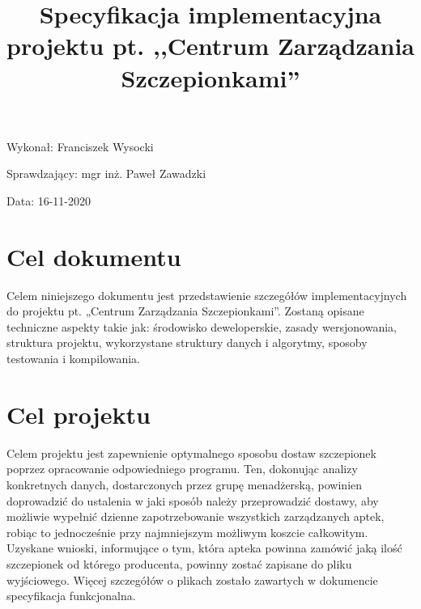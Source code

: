 \documentclass{article}
\title{Specyfikacja implementacyjna projektu pt. ,,Centrum Zarządzania Szczepionkami''}
\author{}
\date{}
\begin{document}
\maketitle

\begin{flushright}
\par
\vfill
\par
{\fontsize{11}{11}\selectfont
    Wykonał: Franciszek Wysocki

    Sprawdzający: mgr inż. Paweł Zawadzki

    Data: 16-11-2020
}
\end{flushright}
\thispagestyle{empty}

\newpage

\tableofcontents

\newpage

\section{Cel dokumentu}
{\fontsize{13}{13}\selectfont
    Celem niniejszego dokumentu jest przedstawienie szczegółów implementacyjnych do projektu pt. „Centrum Zarządzania Szczepionkami”. Zostaną opisane techniczne aspekty takie jak: środowisko deweloperskie, zasady wersjonowania, struktura projektu, wykorzystane struktury danych i algorytmy, sposoby testowania i kompilowania. 
}


\section{Cel projektu}
{\fontsize{13}{13}\selectfont
    Celem projektu jest zapewnienie optymalnego sposobu dostaw szczepionek poprzez opracowanie odpowiedniego programu. Ten, dokonując analizy konkretnych danych, dostarczonych przez grupę menadżerską, powinien doprowadzić do ustalenia w jaki sposób należy przeprowadzić dostawy, aby możliwie wypełnić dzienne zapotrzebowanie wszystkich zarządzanych aptek, robiąc to jednocześnie przy najmniejszym możliwym koszcie całkowitym. Uzyskane wnioski, informujące o tym, która apteka powinna zamówić jaką ilość szczepionek od którego producenta, powinny zostać zapisane do pliku wyjściowego. Więcej szczegółów o plikach zostało zawartych w dokumencie specyfikacja funkcjonalna.

}
\end{document}
